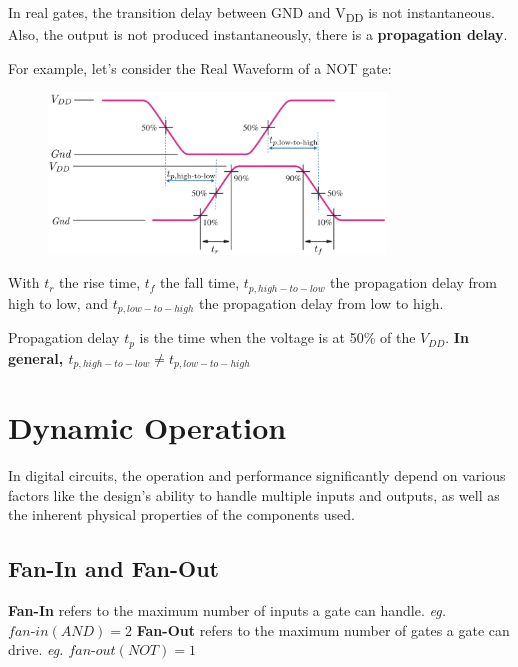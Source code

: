 \documentclass[12pt,openany, tikz,border=10pt]{book}
\newcommand{\minidash}{\text{-}}
\begin{document}
\newpage
In real gates, the transition delay between GND and V\textsubscript{DD} is not instantaneous.
Also, the output is not produced instantaneously, there is a \textbf{propagation delay}.

\vspace*{10px}
For example, let's consider the Real Waveform of a NOT gate:
\begin{figure}[h]
    \centering
    \includegraphics[width=0.8\textwidth]{circuits/9.3.2.png} 
    \end{figure}

    With $t_r$ the rise time, $t_f$ the fall time, $t_{p,high-to-low}$ the propagation delay from high to low, and $t_{p,low-to-high}$ the propagation delay from low to high. \newline

Propagation delay $t_p$ is the time when the voltage is at 50\% of the $V_{DD}$.\newline 
\textbf{In general, $t_{p,high-to-low} \neq t_{p,low-to-high}$} \newline
\newpage
\section{Dynamic Operation}

In digital circuits, the operation and performance significantly depend on various factors like the design's ability to handle multiple inputs and outputs, as well as the inherent physical properties of the components used. 

\subsection{Fan-In and Fan-Out}

\textbf{Fan-In} refers to the maximum number of inputs a gate can handle. \textit{eg. $fan\minidash{}in(AND) = 2$}
\vspace{10px}
\newline
\textbf{Fan-Out} refers to the maximum number of gates a gate can drive. \textit{eg. $fan\minidash{}out(NOT) = 1$}
\end{document}
